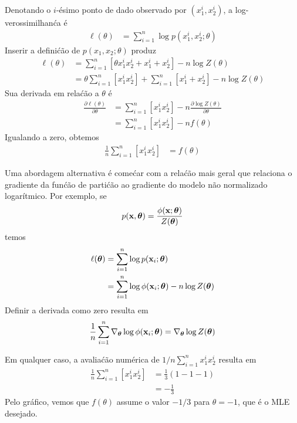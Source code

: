 \begin{exenumerate}
\begin{solution}
        Denotando o $i$-\'esimo ponto de dado observado por $(x_1^i,x_2^i)$,
        a log-verossimilhan\'ca \'e
        \begin{align}
            \ell(\theta) & = \sum_{i=1}^n \log p(x_1^i,x_2^i; \theta)
        \end{align}
        Inserir a defini\'c\~ao de $p(x_1,x_2;\theta)$ produz
        \begin{align}
            \ell(\theta)  & = \sum_{i=1}^n \left[ \theta x_1^i x_2^i+x_1^i+x_2^i \right] - n \log Z(\theta)\\
            &= \theta \sum_{i=1}^n \left[x_1^i x_2^i\right] + \sum_{i=1}^n \left[x_1^i+x_2^i \right] - n\log Z(\theta)
        \end{align}
        Sua derivada em rela\'c\~ao a $\theta$ \'e
        \begin{align}
            \frac{\partial \ell(\theta)}{\partial \theta} & =  \sum_{i=1}^n \left[x_1^i x_2^i\right] - n  \frac{\partial \log Z(\theta)}{\partial \theta}\\
            & =  \sum_{i=1}^n \left[x_1^i x_2^i\right] - n f(\theta)
        \end{align}
        Igualando a zero, obtemos
        \begin{align}
            \frac{1}{n}  \sum_{i=1}^n \left[x_1^i x_2^i\right] &= f(\theta)
        \end{align}
        
        Uma abordagem alternativa \'e come\'car com a rela\'c\~ao mais geral
        que relaciona o gradiente da fun\'c\~ao de parti\'c\~ao
        ao gradiente do modelo n\~ao normalizado logar\'itmico. Por exemplo, se
        $$ p(\mathbf{x},\boldsymbol{\theta}) = \frac{\phi(\mathbf{x}; \boldsymbol{\theta})}{Z(\boldsymbol{\theta})}$$
        temos
        \begin{align}
            \ell(\boldsymbol{\theta}) &= \sum_{i=1}^n \log p(\mathbf{x}_i;\boldsymbol{\theta}) \\
            & = \sum_{i=1}^n \log \phi(\mathbf{x}_i;\boldsymbol{\theta}) -n \log Z(\boldsymbol{\theta})
        \end{align}
        Definir a derivada como zero resulta em
        $$\frac{1}{n} \sum_{i=1}^n \nabla_{\boldsymbol{\theta}}  \log \phi(\mathbf{x}_i;\boldsymbol{\theta}) = \nabla_{\boldsymbol{\theta}} \log Z(\boldsymbol{\theta})$$
        
        Em qualquer caso, a avalia\'c\~ao num\'erica de $1/n \sum_{i=1}^n x_1^i x_2^i$ resulta em
        \begin{align}
            \frac{1}{n}  \sum_{i=1}^n \left[x_1^i x_2^i\right] & = \frac{1}{3}\left(1-1-1\right)\\
            &= -\frac{1}{3}
        \end{align}
        Pelo gr\'afico, vemos que $f(\theta)$ assume o valor $-1/3$
        para $\theta = -1$, que \'e o MLE desejado. 
        
    \end{solution}
    
\end{exenumerate}

